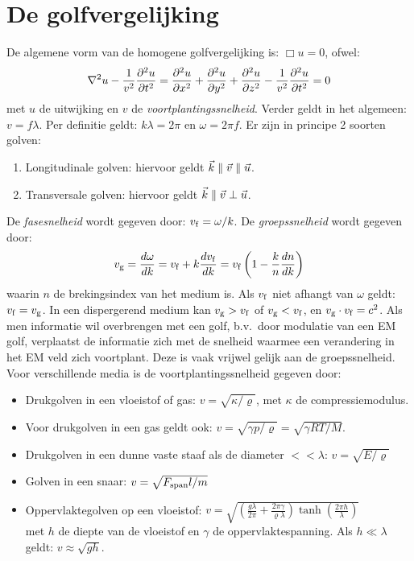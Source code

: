 \documentclass[twoside]{report}
\begin{document}
\section{De golfvergelijking}
De algemene vorm van de homogene golfvergelijking is: $\Box u=0$, ofwel:
\[
\nabla^2u-\frac{1}{v^2}\frac{\partial^2 u}{\partial t^2}=\frac{\partial^2 u}{\partial x^2}+\frac{\partial^2 u}{\partial y^2}+\frac{\partial^2 u}{\partial z^2}-\frac{1}{v^2}\frac{\partial^2 u}{\partial t^2}=0
\]
met $u$ de uitwijking en $v$ de {\it voortplantingssnelheid}. Verder geldt in
het algemeen: $v=f\lambda$. Per definitie geldt: $k\lambda=2\pi$ en
$\omega=2\pi f$.
\npar
Er zijn in principe 2 soorten golven:
\begin{enumerate}
\item Longitudinale golven: hiervoor geldt $\vec{k}\parallel\vec{v}\parallel\vec{u}$.
\item Transversale golven: hiervoor geldt $\vec{k}\parallel\vec{v}\perp\vec{u}$.
\end{enumerate}
De {\it fasesnelheid} wordt gegeven door: $v_{\rm f}=\omega/k$. De
{\it groepssnelheid} wordt gegeven door:
\[
v_{\rm g}=\frac{d\omega}{dk}=v_{\rm f}+k\frac{dv_{\rm f}}{dk}=
v_{\rm f}\left(1-\frac{k}{n}\frac{dn}{dk}\right)
\]
waarin $n$ de brekingsindex van het medium is. Als $v_{\rm f}$ niet afhangt
van $\omega$ geldt: $v_{\rm f}=v_{\rm g}$. In een dispergerend medium kan
$v_{\rm g}>v_{\rm f}$ of $v_{\rm g}<v_{\rm f}$, en $v_{\rm g}\cdot v_{\rm f}=c^2$.
Als men informatie wil overbrengen met een golf, b.v.\ door modulatie van een
EM golf, verplaatst de informatie zich met de snelheid waarmee een
verandering in het EM veld zich voortplant. Deze is vaak vrijwel gelijk aan
de groepssnelheid.
\npar
Voor verschillende media is de voortplantingssnelheid gegeven door:
\begin{itemize}
\item Drukgolven in een vloeistof of gas: $v=\sqrt{\kappa/\varrho}$, met
      $\kappa$ de compressiemodulus.
\item Voor drukgolven in een gas geldt ook: $v=\sqrt{\gamma p/\varrho}=\sqrt{\gamma RT/M}$.
\item Drukgolven in een dunne vaste staaf als de diameter $<<\lambda$: $v=\sqrt{E/\varrho}$
\item Golven in een snaar: $v=\sqrt{F_{\rm span}l/m}$
\item Oppervlaktegolven op een vloeistof: $\displaystyle v=
      \sqrt{\left(\frac{g\lambda}{2\pi}+\frac{2\pi\gamma}{\varrho\lambda}\right)
      \tanh\left(\frac{2\pi h}{\lambda}\right)}$\\
      met $h$ de diepte van de vloeistof en $\gamma$ de oppervlaktespanning.
      Als $h\ll\lambda$ geldt: $v\approx\sqrt{gh}$.
\end{itemize}
\end{document}
